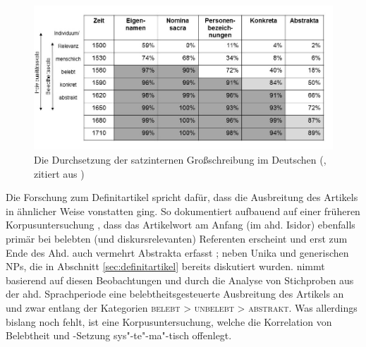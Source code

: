 \begin{figure}
\begin{center}
\includegraphics[width=12cm]{images/SGS-bergmann-szczepaniak-neu.jpg}
\caption {Die Durchsetzung der satzinternen Großschreibung im Deutschen (\citealt{Bergmann1999}, zitiert aus \citealt[351]{Szczepaniak2011})}
\label{sgs}
\end{center}
\end{figure} 

Die Forschung zum Definitartikel spricht dafür, dass die Ausbreitung des Artikels in ähnlicher Weise vonstatten ging. So dokumentiert \textcite[]{Oubouzar1992} aufbauend auf einer früheren Korpusuntersuchung \parencite{Oubouzar1989}, dass das  Artikelwort  am Anfang (im ahd. Isidor) ebenfalls primär bei belebten (und diskursrelevanten) Referenten erscheint \parencite[vgl. insbesondere][566--567]{Oubouzar1989} und erst zum Ende des Ahd. auch vermehrt Abstrakta erfasst \parencite[][572]{Oubouzar1989}; neben Unika und generischen NPs, die in Abschnitt \ref{sec:definitartikel} bereits diskutiert wurden. \textcite[73--78]{Szczepaniak2011} nimmt basierend auf diesen Beobachtungen und durch die Analyse von Stichproben aus der ahd. Sprachperiode eine belebtheitsgesteuerte Ausbreitung des Artikels an und zwar entlang der Kategorien \textsc{belebt > unbelebt > abstrakt}. Was allerdings bislang noch fehlt, ist eine Korpusuntersuchung, welche die Korrelation von Belebtheit und -Setzung sys"-te"-ma"-tisch offenlegt. 

